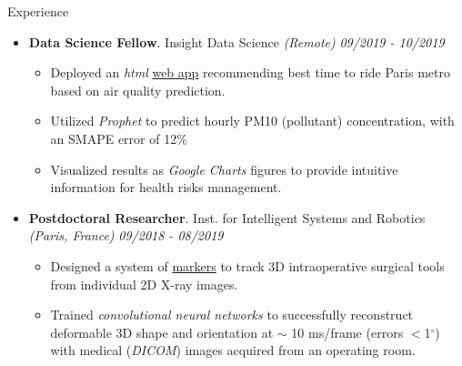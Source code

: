 \documentclass{resume} %
\begin{document}
\begin{rSection}{Experience}
\begin{itemize}[leftmargin=0em]
			\item {\bf Data Science Fellow}{. Insight Data Science \textit{(Remote)}} \hfill {\em 09/2019 - 10/2019}\\
			\vspace{-5mm}
			\begin{itemize}
				\setlength\itemsep{-1.75em}
				\item Deployed an \textit{html} \href{https://tinyurl.com/parispollute}{web app} recommending best time to ride Paris metro based on air quality prediction.\\
				\item Utilized \textit{Prophet} to predict hourly PM10 (pollutant) concentration, with an SMAPE error of 12\% \\
				\item Visualized results as \textit{Google Charts} figures to provide intuitive information for health risks management.
			\end{itemize}	
			
			\item {\bf Postdoctoral Researcher}{. Inst. for Intelligent Systems and Robotics \textit{(Paris, France)}} \hfill {\em 09/2018 - 08/2019}\\
			\vspace{-5mm}
			\begin{itemize}
				\setlength\itemsep{-1.75em}
				\item  Designed a system of \href{https://tinyurl.com/yxk4jou4}{markers} to track 3D intraoperative surgical tools from individual 2D X-ray images.\\ 
				\item  Trained \textit{convolutional neural networks} to successfully reconstruct deformable 3D shape and orientation at $\sim$ 10 ms/frame (errors $<$1$^\circ$) with medical (\textit{DICOM}) images acquired from an operating room.
			\end{itemize}
			

\end{itemize}
\end{rSection}
\end{document}
